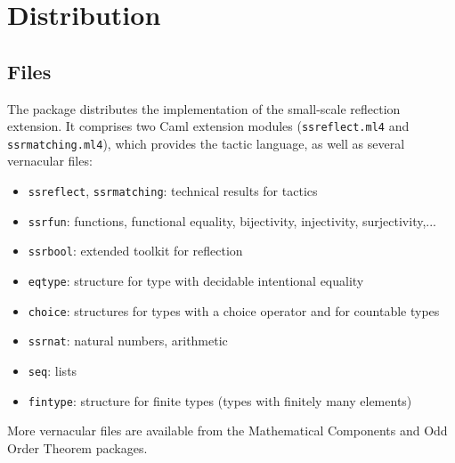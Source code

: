 \section{Distribution}

\subsection{Files}\label{sec:files}
The \ssr{} package distributes the implementation of the
small-scale reflection extension. It comprises
two Caml extension modules ({\tt ssreflect.ml4} and {\tt
  ssrmatching.ml4}), which provides the tactic language, as well as several
\Coq{} vernacular files:
\begin{itemize}
\item {\tt ssreflect}, {\tt ssrmatching}: technical results for \ssr{} tactics
\item {\tt ssrfun}: functions, functional equality, bijectivity,
  injectivity, surjectivity,...
\item {\tt ssrbool}: extended toolkit for reflection
\item {\tt eqtype}: structure for type with decidable intentional equality
\item {\tt choice}: structures for types with a choice operator and for
  countable types
\item {\tt ssrnat}: natural numbers, arithmetic
\item {\tt seq}: lists
\item {\tt fintype}: structure for finite types
          (types with finitely many elements)
\end{itemize}
More \Coq{} vernacular files are available from the
Mathematical Components and Odd Order Theorem packages.


